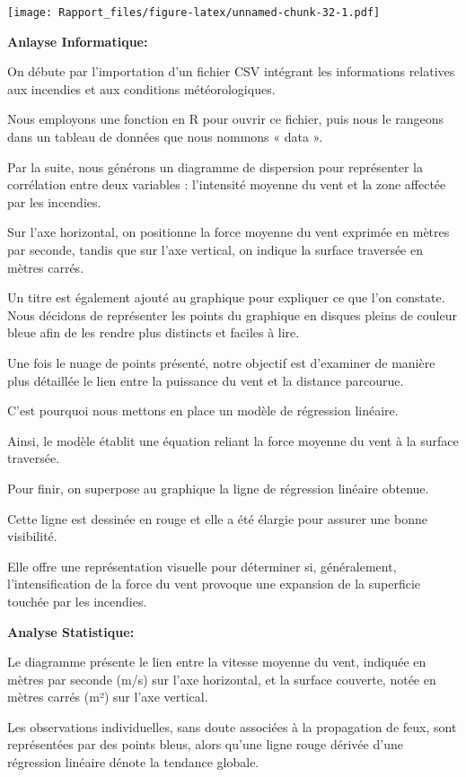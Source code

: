 \documentclass[
]{article}
\begin{document}
\texttt{[image: Rapport\_files/figure-latex/unnamed-chunk-32-1.pdf]}

\textbf{Anlayse Informatique:}

On débute par l'importation d'un fichier CSV intégrant les informations
relatives aux incendies et aux conditions météorologiques.

Nous employons une fonction en R pour ouvrir ce fichier, puis nous le
rangeons dans un tableau de données que nous nommons « data ».

Par la suite, nous générons un diagramme de dispersion pour représenter
la corrélation entre deux variables : l'intensité moyenne du vent et la
zone affectée par les incendies.

Sur l'axe horizontal, on positionne la force moyenne du vent exprimée en
mètres par seconde, tandis que sur l'axe vertical, on indique la surface
traversée en mètres carrés.

Un titre est également ajouté au graphique pour expliquer ce que l'on
constate. Nous décidons de représenter les points du graphique en
disques pleins de couleur bleue afin de les rendre plus distincts et
faciles à lire.

Une fois le nuage de points présenté, notre objectif est d'examiner de
manière plus détaillée le lien entre la puissance du vent et la distance
parcourue.

C'est pourquoi nous mettons en place un modèle de régression linéaire.

Ainsi, le modèle établit une équation reliant la force moyenne du vent à
la surface traversée.

Pour finir, on superpose au graphique la ligne de régression linéaire
obtenue.

Cette ligne est dessinée en rouge et elle a été élargie pour assurer une
bonne visibilité.

Elle offre une représentation visuelle pour déterminer si, généralement,
l'intensification de la force du vent provoque une expansion de la
superficie touchée par les incendies.

\textbf{Analyse Statistique:}

Le diagramme présente le lien entre la vitesse moyenne du vent, indiquée
en mètres par seconde (m/s) sur l'axe horizontal, et la surface
couverte, notée en mètres carrés (m²) sur l'axe vertical.

Les observations individuelles, sans doute associées à la propagation de
feux, sont représentées par des points bleus, alors qu'une ligne rouge
dérivée d'une régression linéaire dénote la tendance globale.
\end{document}
